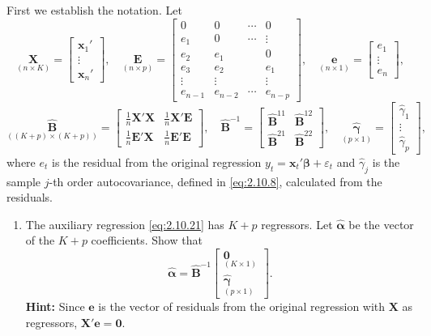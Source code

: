 \begin{problemset}
First we establish the notation. Let
\[
\underset{(n\times K)}{\mathbf{X}}
= \begin{bmatrix} \mathbf{x}_1' \\ \vdots \\ \mathbf{x}_n' \end{bmatrix}, \quad
\underset{(n\times p)}{\mathbf{E}}
= \begin{bmatrix}
0 & 0 & \cdots & 0 \\
e_1 & 0 & \cdots & \vdots \\
e_2 & e_1 & & 0 \\
e_3 & e_2 & & e_1 \\
\vdots & \vdots & & \vdots \\
e_{n-1} & e_{n-2} & \cdots & e_{n-p}
\end{bmatrix}, \quad
\underset{(n\times 1)}{\mathbf{e}}
= \begin{bmatrix} e_1 \\ \vdots \\ e_n \end{bmatrix},
\]
\[
\underset{((K+p)\times(K+p))}{\widehat{\mathbf{B}}}
= \begin{bmatrix}
\frac{1}{n}\mathbf{X}'\mathbf{X} & \frac{1}{n}\mathbf{X}'\mathbf{E} \\[4pt]
\frac{1}{n}\mathbf{E}'\mathbf{X} & \frac{1}{n}\mathbf{E}'\mathbf{E}
\end{bmatrix}, \quad
\widehat{\mathbf{B}}^{-1} = \begin{bmatrix}
\widehat{\mathbf{B}}^{11} & \widehat{\mathbf{B}}^{12} \\
\widehat{\mathbf{B}}^{21} & \widehat{\mathbf{B}}^{22}
\end{bmatrix}, \quad
\underset{(p\times 1)}{\hat{\bm{\gamma}}}
= \begin{bmatrix} \hat{\gamma}_1 \\ \vdots \\ \hat{\gamma}_p \end{bmatrix},
\]
where $e_t$ is the residual from the original regression
$y_t = \mathbf{x}_t'\bm{\beta} + \varepsilon_t$ and $\hat{\gamma}_j$ is the sample $j$-th order
autocovariance, defined in \eqref{eq:2.10.8}, calculated from the residuals.
\begin{enumerate}[label=(\alph*)]
\item The auxiliary regression \eqref{eq:2.10.21} has $K + p$ regressors. Let
$\hat{\bm{\alpha}}$ be the vector of the $K + p$ coefficients. Show that
\[
\hat{\bm{\alpha}} = \widehat{\mathbf{B}}^{-1}
\begin{bmatrix} \mathbf{0} \\ {}_{(K\times 1)} \\[2pt] \hat{\bm{\gamma}} \\ {}_{(p\times 1)} \end{bmatrix}.
\]
\textbf{Hint:} Since $\mathbf{e}$ is the vector of residuals from the original regression with
$\mathbf{X}$ as regressors, $\mathbf{X}'\mathbf{e} = \mathbf{0}$.


\end{enumerate}
\end{problemset}
